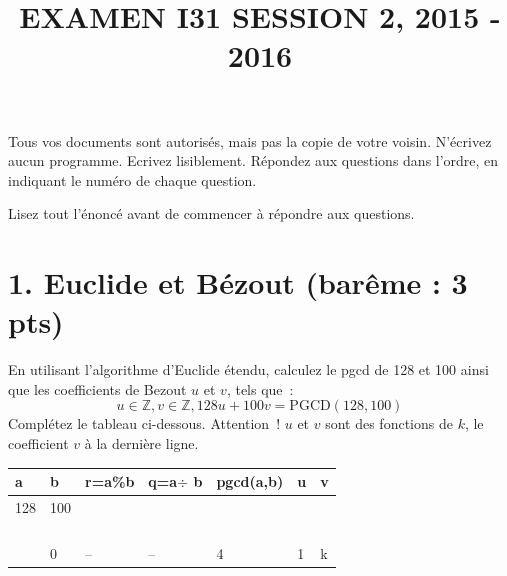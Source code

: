 \documentclass[11pt]{article}
\def\Z{\mathbb Z}
\begin{document}
\title{EXAMEN I31 SESSION 2, 2015 - 2016}
\date{}\maketitle

Tous vos documents sont autorisés, mais pas la copie de votre voisin.
N’écrivez aucun programme. Ecrivez lisiblement. Répondez aux questions
dans l’ordre, en indiquant le numéro de chaque question.

\medskip
Lisez tout l'énoncé avant de commencer à répondre aux questions.

{
\section*{1. Euclide et Bézout (barême : 3 pts)}

En utilisant l'algorithme d'Euclide étendu, calculez le pgcd de 128 et 100 ainsi que les coefficients de Bezout $u$ et $v$, tels que~:
$$u\in \Z, v\in \Z, 128u + 100 v=\mbox{PGCD}(128, 100)$$
Complétez le tableau ci-dessous. Attention~! $u$ et $v$ sont des fonctions 
de $k$, le coefficient $v$  à la dernière ligne. 

\medskip
{\small
\begin{tabular}{|p{1.3cm}|p{1.3cm}|p{1.3cm}|p{1.3cm}|p{1.3cm}|p{1.3cm}|p{1.3cm}|}
\hline a & b & r=a\%b & q=a$\div$ b & pgcd(a,b) & u & v\\ 
\hline 
\hline  
128   &  100   &      &     &    &   &  \\
\hline  
&   &  &  &   &  &   \\
\hline 
 &   & & & &   &  \\
\hline 
 &   & & & &   &  \\
\hline  
 &   & & & &   &  \\
\hline
&  0  & --   & --   & 4 &  1 & k   \\
\hline
\end{tabular}
}
}
\end{document}
